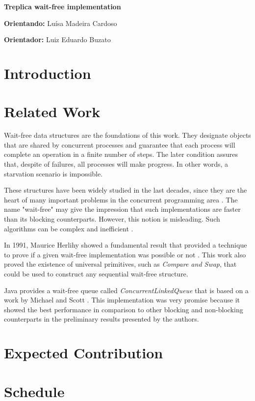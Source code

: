 \documentclass[12pt,twoside,a4paper]{article}
\begin{document}
\vskip 15mm

\begin{center} 
\textbf{Treplica wait-free implementation}
\end{center}

\vskip 5mm

\textbf{Orientando:} Luísa Madeira Cardoso

\textbf{Orientador:} Luiz Eduardo Buzato 

\vskip 20mm

\begin{abstract}

\end{abstract}

\newpage
\pagestyle{plain}
\headheight 0.0cm
\headsep 0.0cm
\footskip 2.2cm

\section{Introduction}


\section{Related Work}
\label{sec:related}

Wait-free data structures are the foundations of this work. They designate objects that are shared by concurrent processes and guarantee that each process will complete an operation in a finite number of steps. The later condition assures that, despite of failures, all processes will make progress. In other words, a starvation scenario is impossible. 

These structures have been widely studied in the last decades, since they are the heart of many important problems in the concurrent programming area \cite{herlihy2011art}.
The name "wait-free" may give the impression that such implementations are faster than its blocking counterparts. However, this notion is misleading.  Such algorithms can be complex and inefficient \cite{attiya1994wait}.  

In 1991, Maurice Herlihy showed a fundamental result that provided a technique to prove if a given wait-free implementation was possible or not \cite{herlihy1991wait}. This work also proved the existence of universal primitives, such as \textit{Compare and Swap}, that could be used to construct any sequential wait-free structure. 

Java provides a wait-free queue called \textit{ConcurrentLinkedQueue} that is based on a work by Michael and Scott \cite{michael1996simple}. This implementation was very promise because it showed the best performance in comparison to other blocking and non-blocking counterparts in the preliminary results presented by the authors. 


\section{Expected Contribution}
\label{sec:contrib}


 
\section{Schedule}
\label{sec:schedule}


\vskip 15mm

{}

\end{document}

